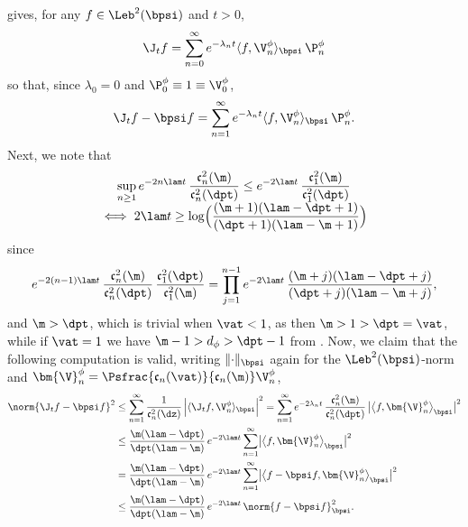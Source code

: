  gives, for any $f \in \Leb^2(\bpsi)$ and $t > 0$,
\begin{equation*}
\J_t f = \sum_{n=0}^{\infty} e^{-\lambda_n t} \langle f, \V_n^\phi \rangle_{\bpsi}\, \P_n^\phi
\end{equation*}
so that, since $\lambda_0=0$ and $\P_0^\phi \equiv 1 \equiv \V_0^\phi$,
\begin{equation}
\label{eq:J-t-minus}
\J_tf - \bpsi f = \sum_{n=1}^\infty e^{-\lambda_n t} \langle f, \V_n^\phi \rangle_{\bpsi}\, \P_n^\phi.
\end{equation}
Next, we note that
\begin{multline}
\label{eq:sup-t}
\sup_{n \geq 1} e^{-2n\lam t}\,\frac{\mathfrak{c}_n^2(\m)}{\mathfrak{c}_n^2(\dpt)} \leq e^{- 2\lam t}\,\frac{\mathfrak{c}_1^2(\m)}{\mathfrak{c}_1^2(\dpt)}\\[-5pt]
\iff 2\lam t \geq \log\Bigl(\frac{(\m+1)(\lam-\dpt+1)}{(\dpt+1)(\lam-\m+1)}\Bigr)
\end{multline}
since
\begin{equation*}
e^{-2(n-1)\lam t}\,\frac{\mathfrak{c}_n^2(\m)}{\mathfrak{c}_n^2(\dpt)}\,\frac{\mathfrak{c}_1^2(\dpt)}{\mathfrak{c}_1^2(\m)} = \prod_{j=1}^{n-1} e^{-2\lam t}\, \frac{(\m+j)(\lam-\dpt+j)}{(\dpt+j)(\lam-\m+j)},
\end{equation*}
and $\m > \dpt$, which is trivial when $\vat < 1$, as then $\m > 1 > \dpt = \vat$, while if $\vat =1$ we have $\m-1> d_\phi > \dpt-1$ from \cite[Prop.\,4.4(1)]{Patie-Savov-GeL}. Now, we claim that the following computation is valid, writing $\|{\cdot}\|_\bpsi$ again for the $\Leb^2(\bpsi)$-norm and $\bm{\V}_n^\phi = \Psfrac{\mathfrak{c}_n(\vat)}{\mathfrak{c}_n(\m)}\V_n^\phi$,
\begin{align*}
\norm{\J_t f - \bpsi f}^2
&\leq \sum_{n=1}^\infty \frac{1}{\mathfrak{c}_n^2(\dz)} \left| \langle \J_t f, \V_n^\phi \rangle_{\bpsi} \right|^2 = \sum_{n=1}^\infty e^{-2 \lambda_n t}\,\frac{\mathfrak{c}_n^2(\m)}{\mathfrak{c}_n^2(\dpt)}\, \bigl| \bigl\langle f, \bm{\V}_n^\phi \bigr\rangle_{\bpsi} \bigr|^2 \\
&\leq \frac{\m(\lam-\dpt)}{\dpt(\lam-\m)}\, e^{-2\lam t} \sum_{n=1}^\infty \bigl| \bigl\langle f, \bm{\V}_n^\phi \bigr\rangle_{\bpsi} \bigr|^2\\
&= \frac{\m(\lam-\dpt)}{\dpt(\lam-\m)}\, e^{-2\lam t} \sum_{n=1}^\infty \bigl| \bigl\langle f-\bpsi f, \bm{\V}_n^\phi \bigr\rangle_{\bpsi} \bigr|^2 \\
&\leq \frac{\m(\lam-\dpt)}{\dpt(\lam-\m)}\, e^{-2\lam t}\, \norm{f-\bpsi f}_\bpsi^2.
\end{align*}
